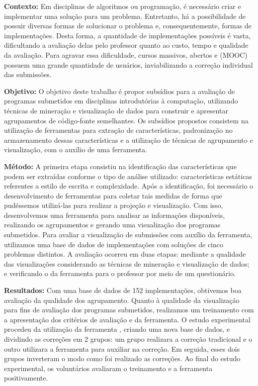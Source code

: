 \begin{resumo}
\textbf{Contexto:} Em disciplinas de algoritmos ou programação, é necessário criar
e implementar uma solução para um problema. Entretanto, há a possibilidade de possuir
diversas formas de solucionar o problema e, consequentemente, formas de implementações.
Desta forma, a quantidade de implementações possíveis é vasta, dificultando a avaliação
delas pelo professor quanto ao custo, tempo e qualidade da avaliação.
Para agravar essa dificuldade, cursos massivos, abertos e  (MOOC)
possuem uma grande quantidade de usuários, inviabilizando
a correção individual das submissões.

\textbf{Objetivo:} O objetivo deste trabalho é propor subsídios para a avaliação de
programas submetidos em disciplinas introdutórias à computação, utilizando técnicas
de mineração e visualização de dados para construir e apresentar agrupamentos de
código-fonte semelhantes. Os subsídios propostos consistem na utilização de ferramentas
para extração de características, padronização no armazenamento dessas características
e a utilização de técnicas de agrupamento e visualização, com o auxílio de uma ferramenta.

\textbf{Método:} A primeira etapa consistiu na identificação das características que
podem ser extraídas conforme o tipo de análise utilizado: características estáticas
referentes a estilo de escrita e complexidade. Após a identificação, foi necessário
o desenvolvimento de ferramentas para coletar tais medidas de forma que pudéssemos
utilizá-las para realizar a projeção e visualização. Com isso, desenvolvemos uma
ferramenta para analisar as informações disponíveis, realizando os agrupamentos e
gerando uma visualização dos programas submetidos.
Para avaliar a visualização de submissões com auxílio da ferramenta, utilizamos
uma base de dados de implementações com soluções de cinco
problemas distintos. A avaliação ocorreu em duas etapas: mediante a qualidade
das visualizações considerando as técnicas de mineração e visualização de dados; e
verificando o  da ferramenta para o professor por meio de um
questionário.

\textbf{Resultados:} Com uma base de dados de 152 implementações, obtivemos boa
avaliação da qualidade dos agrupamento. Quanto à qualidade da visualização para
fins de avaliação dos programas submetidos, realizamos um treinamento com a
apresentação dos critérios de avaliação e da ferramenta. O estudo experimental
procedeu da utilização da
ferramenta , criando uma nova base de dados, e dividindo
as correções em 2 grupos: um grupo realizara a correção tradicional e o outro
utilizara a ferramenta para auxiliar na correção. Em seguida, esses dois grupos
inverteram o modo como foi realizado as correções. Ao final do estudo experimental,
os voluntários avaliaram o treinamento e a ferramenta positivamente.


\end{resumo}
